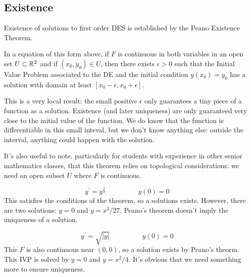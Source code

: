 \documentclass[fleqn,letterpaper]{report}
\begin{document}
\subsection{Existence}
\label{existence}

Existence of solutions to first order DES is established by
the Peano Existence Theorem. 

\begin{thm}
In a equation of this form above, if $F$ is continuous in both variables
in an open set $U \subset \mathbb{R}^2$ and if $(x_0,y_0) \in U$,
then there exists $\epsilon > 0$ such that the Initial Value
Problem associated to the DE and the initial condition $y(x_0)
= y_0$ has a solution with domain at least
$[x_0-\epsilon,x_0+\epsilon]$. 
\end{thm}

This is a very local result: the small positive $\epsilon$
only guarantees a tiny piece of a function as a solution.
Existence (and later uniqueness) are only guaranteed very
close to the initial value of the function. We do know that
the function is differentiable in this small inteval, but we
don't know anything else: outside the interval, anything could
happen with the solution.

It's also useful to note, particularly for students with
experience in other senior mathematics classes, that this
theorem relies on topological considerations: we need an open
subset $U$ where $F$ is continuous.

\begin{example}
\begin{equation*}
y^\prime = y^{\frac{2}{3}} \hspace{2cm} y(0)=0
\end{equation*}
This satisfies the conditions of the theorem, so a solutions
exists. However, there are two solutions: $y=0$ and
$y=x^3/27$. Peano's theorem doesn't imply the uniqueness of a
solution.
\end{example}

\begin{example}
\begin{equation*}
y^\prime = \sqrt{|y|} \hspace{2cm} y(0) = 0
\end{equation*}
This $F$ is also continuous near $(0,0)$, so a solution exists
by Peano's theorm. This IVP is solved by $y=0$ and $y =
x^2/4$. It's obvious that we need something more to ensure
uniqueness.
\end{example}
\end{document}
